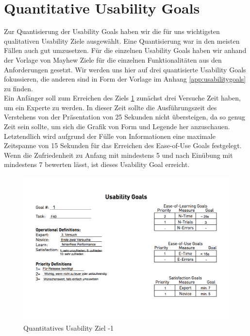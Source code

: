 \section{Quantitative Usability Goals}
Zur Quantisierung der Usability Goals haben wir die für uns wichtigsten qualitativen Usability Ziele ausgewählt. Eine Quantisierung war in den meisten Fällen auch gut umzusetzen. Für die einzelnen Usability Goals haben wir anhand der Vorlage von Mayhew \cite[142]{Mayhew:UEL} Ziele für die einzelnen Funktionalitäten aus den Anforderungen gesetzt. Wir werden uns hier auf drei quantisierte Usability Goals fokussieren, die anderen sind in Form der Vorlage im Anhang \ref{app:usabilitygoals} zu finden. \\

Ein Anfänger soll zum Erreichen des Ziels \ref{ugoals:1} zunächst drei Versuche Zeit haben, um ein Experte zu werden. In dieser Zeit sollte die Ausführungszeit des Verstehens von der Präsentation von 25 Sekunden nicht übersteigen, da so genug Zeit sein sollte, um sich die Grafik von Form und Legende her anzuschauen. Letztendlich wird aufgrund der Fülle von Informationen eine maximale Zeitspanne von 15 Sekunden für das Erreichen des Ease-of-Use Goals festgelegt. Wenn die Zufriedenheit zu Anfang mit mindestens 5 und nach Einübung mit mindestens 7 bewerten lässt, ist dieses Usability Goal erreicht.  

\begin{figure}
	\centering
	\includegraphics[width=\textwidth,height=\textheight,
keepaspectratio]{Usagoalstask1}
	\caption{Quantitatives Usability Ziel -1}
	\label{ugoals:1}
\end{figure}

